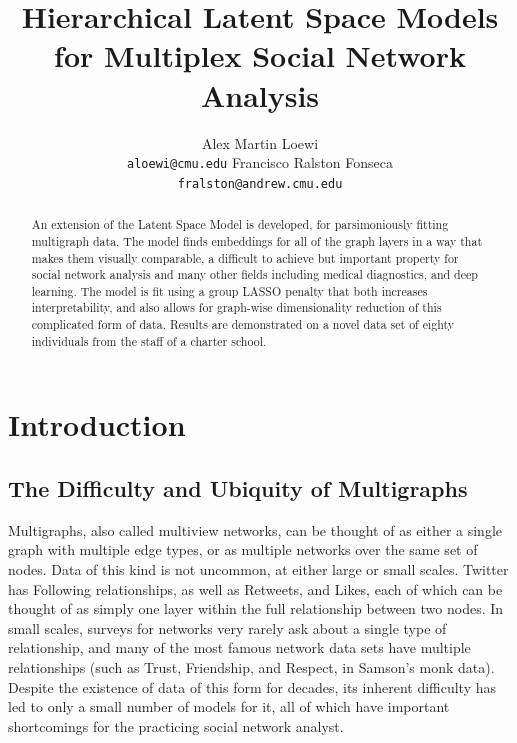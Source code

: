 \documentclass{article}
\title{Hierarchical Latent Space Models\\for Multiplex Social Network Analysis}
\author{
  Alex Martin Loewi \\
  \texttt{aloewi@cmu.edu}
  \And
  Francisco Ralston Fonseca\\
  \texttt{fralston@andrew.cmu.edu}
}
\begin{document}

\maketitle

\begin{abstract}
An extension of the Latent Space Model is developed, for parsimoniously fitting multigraph data. The model finds embeddings for all of the graph layers in a way that makes them visually comparable, a difficult to achieve but important property for social network analysis and many other fields including medical diagnostics, and deep learning. The model is fit using a group LASSO penalty that both increases interpretability, and also allows for graph-wise dimensionality reduction of this complicated form of data. Results are demonstrated on a novel data set of eighty individuals from the staff of a charter school.
\end{abstract}

\section{Introduction}

\subsection{The Difficulty and Ubiquity of Multigraphs} %

Multigraphs, also called multiview networks, can be thought of as either a single graph with multiple edge types, or as multiple networks over the same set of nodes. Data of this kind is not uncommon, at either large or small scales. Twitter has Following relationships, as well as Retweets, and Likes, each of which can be thought of as simply one layer within the full relationship between two nodes. In small scales, surveys for networks very rarely ask about a single type of relationship, and many of the most famous network data sets have multiple relationships (such as Trust, Friendship, and Respect, in Samson's monk data). Despite the existence of data of this form for decades, its inherent difficulty has led to only a small number of models for it, all of which have important shortcomings for the practicing social network analyst.
\end{document}
